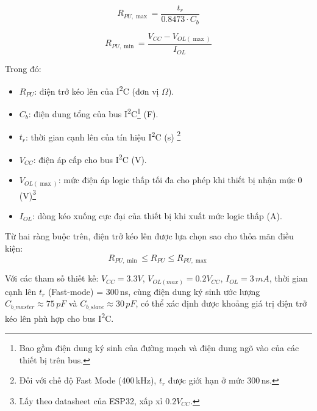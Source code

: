             \begin{minipage}{0.35\textwidth}
                \centering
                \begin{equation}
                R_{PU,\max} = \frac{t_r}{0.8473 \cdot C_b}
                \end{equation}
                
                \begin{equation}
                R_{PU,\min} = \frac{V_{CC} - V_{OL(\max)}}{I_{OL}}
                \end{equation}
            \end{minipage}
            \hfill
            \begin{minipage}{0.55\textwidth}
                Trong đó:
                \begin{itemize}
                    \item \(R_{PU}\): điện trở kéo lên của I\textsuperscript{2}C (đơn vị \(\Omega\)).
                    \item \(C_b\): điện dung tổng của bus I\textsuperscript{2}C\footnote{Bao gồm điện dung ký sinh của đường mạch và điện dung ngõ vào của các thiết bị trên bus.} (F).
                    \item \(t_r\): thời gian cạnh lên của tín hiệu I\textsuperscript{2}C (s) \footnote{Đối với chế độ Fast Mode (400\,kHz), \(t_r\) được giới hạn ở mức 300\,ns\cite{I2CBusPullupResistorCalculation}.}
                    \item \(V_{CC}\): điện áp cấp cho bus I\textsuperscript{2}C (V).
                    \item \(V_{OL(\max)}\): mức điện áp logic thấp tối đa cho phép khi thiết bị nhận mức 0 (V)\footnote{Lấy theo datasheet của ESP32, xấp xỉ \(0.2V_{CC}\)\cite{Esp32S3WroomDatasheet}.}
                    \item \(I_{OL}\): dòng kéo xuống cực đại của thiết bị khi xuất mức logic thấp (A).
                \end{itemize}
            \end{minipage}

            Từ hai ràng buộc trên, điện trở kéo lên được lựa chọn sao cho thỏa mãn điều kiện:
            \begin{equation}
            R_{PU,\min} \leq R_{PU} \leq R_{PU,\max}
            \end{equation}
            
            

            Với các tham số thiết kế: $V_{CC} = 3.3V$, $V_{OL(max)} = 0.2V_{CC}$, $I_{OL} = 3\,mA$, thời gian cạnh lên $t_r$ (Fast-mode) = 300\,ns, cùng điện dung ký sinh ước lượng $C_{b\_master} \approx 75\,pF$ và $C_{b\_slave} \approx 30\,pF$, có thể xác định được khoảng giá trị điện trở kéo lên phù hợp cho bus I\textsuperscript{2}C.


